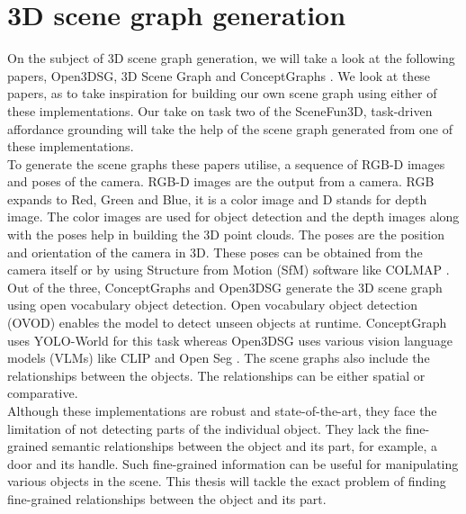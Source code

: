  \section{3D scene graph generation}
On the subject of 3D scene graph generation, we will take a look at the following papers, 
Open3DSG\cite{koch2024open3dsgopenvocabulary3dscene}, 3D Scene Graph \cite{armeni20193d} and ConceptGraphs \cite{gu2023conceptgraphsopenvocabulary3dscene}. 
We look at these papers, as to take inspiration for building our own scene graph 
using either of these implementations. Our take on task two of the SceneFun3D, task-driven affordance grounding will 
take the help of the scene graph generated from one of these implementations. \\
To generate the scene graphs these papers utilise,
a sequence of RGB-D images and poses of the camera. RGB-D images are the output from a camera.
RGB expands to Red, Green and Blue, it is a color image and D stands for depth image. The color images
are used for object detection and the depth images along with the poses help in building the 3D point clouds. The poses are
the position and orientation of the camera in 3D. These poses can be obtained from the camera itself or by using Structure from Motion (SfM) software like
COLMAP \cite{schoenberger2016mvs} \cite{schoenberger2016sfm}. \\ Out of the three, ConceptGraphs and 
Open3DSG generate the 3D scene graph using open vocabulary object detection. Open vocabulary
object detection (OVOD) enables the model to detect unseen objects at runtime. ConceptGraph uses YOLO-World \cite{cheng2024yolow} for this task whereas Open3DSG uses 
various vision language models (VLMs) like CLIP \cite{radford2021learningtransferablevisualmodels} and Open Seg \cite{ghiasi2022scalingopenvocabularyimagesegmentation}.
 The scene graphs also include the relationships between the 
objects. The relationships can be either spatial or comparative. \\
Although these implementations are robust and state-of-the-art, they face the limitation of not detecting
parts of the individual object. They lack the fine-grained semantic relationships between the object and its part, for example, a door and its handle.
Such fine-grained information can be useful for manipulating various objects in the scene. This thesis will tackle the exact problem of 
finding fine-grained relationships between the object and its part.

